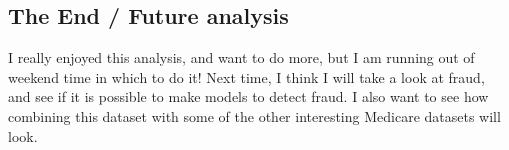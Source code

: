 \subsection{The End / Future analysis}
I really enjoyed this analysis, and want to do more, but I am running out of weekend time in which to do it! Next time, I think I will take a look at fraud, and see if it is possible to make models to detect fraud. I also want to see how combining this dataset with some of the other interesting Medicare datasets will look.



